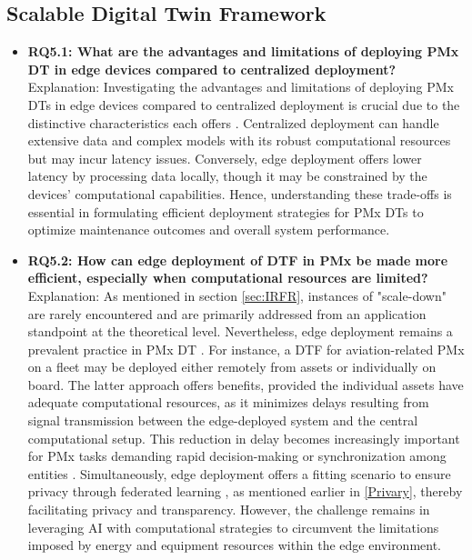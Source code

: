 \documentclass[runningheads]{llncs}
\begin{document}
\subsection{Scalable Digital Twin Framework}
\begin{itemize}
\item \textbf{RQ5.1: What are the advantages and limitations of deploying PMx DT in edge devices compared to centralized deployment?} \\
Explanation: Investigating the advantages and limitations of deploying PMx DTs in edge devices compared to centralized deployment is crucial due to the distinctive characteristics each offers \cite{dhada2021deploy}. Centralized deployment can handle extensive data and complex models with its robust computational resources but may incur latency issues. Conversely, edge deployment offers lower latency by processing data locally, though it may be constrained by the devices' computational capabilities. Hence, understanding these trade-offs is essential in formulating efficient deployment strategies for PMx DTs to optimize maintenance outcomes and overall system performance.

\item \textbf{RQ5.2: How can edge deployment of DTF in PMx be made more efficient, especially when computational resources are limited?} \\
Explanation: As mentioned in section \ref{sec:IRFR}, instances of "scale-down" are rarely encountered and are primarily addressed from an application standpoint at the theoretical level. Nevertheless, edge deployment remains a prevalent practice in PMx DT \cite{dhada2021deploy}. For instance, a DTF for aviation-related PMx on a fleet may be deployed either remotely from assets or individually on board. The latter approach offers benefits, provided the individual assets have adequate computational resources, as it minimizes delays resulting from signal transmission between the edge-deployed system and the central computational setup. This reduction in delay becomes increasingly important for PMx tasks demanding rapid decision-making or synchronization among entities \cite{dong2019deep}. Simultaneously, edge deployment offers a fitting scenario to ensure privacy through federated learning \cite{wang2019adaptive}, as mentioned earlier in \ref{Privary}, thereby facilitating privacy and transparency. However, the challenge remains in leveraging AI with computational strategies to circumvent the limitations imposed by energy and equipment resources within the edge environment.

\end{itemize}
\end{document}
